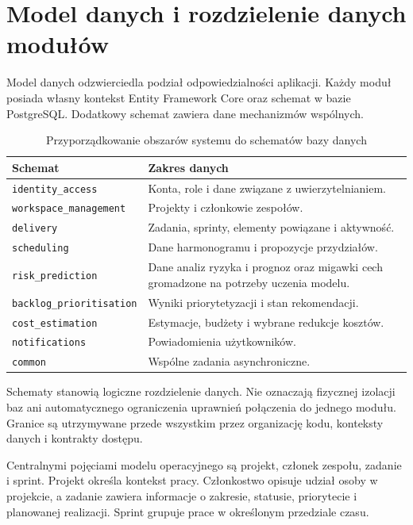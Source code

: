 \section{Model danych i rozdzielenie danych modułów}

Model danych odzwierciedla podział odpowiedzialności aplikacji. Każdy moduł posiada własny kontekst Entity Framework Core oraz schemat w bazie PostgreSQL. Dodatkowy schemat zawiera dane mechanizmów wspólnych.

\begin{table}[htbp]
    \centering
    \small
    \caption{Przyporządkowanie obszarów systemu do schematów bazy danych}
    \label{tab:schematy-bazy}
    \begin{tabularx}{\textwidth}{@{}lX@{}}
        \toprule
        \textbf{Schemat} & \textbf{Zakres danych} \\
        \midrule
        \texttt{identity\_access}
        & Konta, role i dane związane z uwierzytelnianiem. \\
        \texttt{workspace\_management}
        & Projekty i członkowie zespołów. \\
        \texttt{delivery}
        & Zadania, sprinty, elementy powiązane i aktywność. \\
        \texttt{scheduling}
        & Dane harmonogramu i propozycje przydziałów. \\
        \texttt{risk\_prediction}
        & Dane analiz ryzyka i prognoz oraz migawki cech gromadzone na potrzeby uczenia modelu. \\
        \texttt{backlog\_prioritisation}
        & Wyniki priorytetyzacji i stan rekomendacji. \\
        \texttt{cost\_estimation}
        & Estymacje, budżety i wybrane redukcje kosztów. \\
        \texttt{notifications}
        & Powiadomienia użytkowników. \\
        \texttt{common}
        & Wspólne zadania asynchroniczne. \\
        \bottomrule
    \end{tabularx}
\end{table}

Schematy stanowią logiczne rozdzielenie danych. Nie oznaczają fizycznej izolacji baz ani automatycznego ograniczenia uprawnień połączenia do jednego modułu. Granice są utrzymywane przede wszystkim przez organizację kodu, konteksty danych i kontrakty dostępu.

Centralnymi pojęciami modelu operacyjnego są projekt, członek zespołu, zadanie i sprint. Projekt określa kontekst pracy. Członkostwo opisuje udział osoby w projekcie, a zadanie zawiera informacje o zakresie, statusie, priorytecie i planowanej realizacji. Sprint grupuje prace w określonym przedziale czasu.

